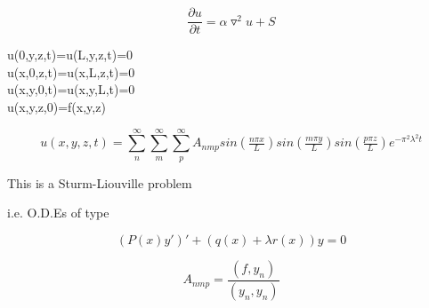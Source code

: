 \documentclass{beamer}
\begin{document}

\section{}

\begin{frame}{}

\begin{equation}
\dfrac{\partial u}{\partial t} = \alpha \triangledown^2 u + S
\end{equation}

u(0,y,z,t)=u(L,y,z,t)=0 \\
u(x,0,z,t)=u(x,L,z,t)=0 \\
u(x,y,0,t)=u(x,y,L,t)=0 \\

u(x,y,z,0)=f(x,y,z)


\begin{equation}
u(x,y,z,t) = \sum_{n}^{\infty}\sum_{m}^{\infty}\sum_{p}^{\infty} A_{nmp}sin(\tfrac{n\pi x}{L})sin(\tfrac{m\pi y}{L})sin(\tfrac{p\pi z}{L})e^{-\pi^2 \lambda^2 t}
\end{equation}

This is a Sturm-Liouville problem

i.e. O.D.Es of type

\begin{equation}
(P(x)y')'+(q(x)+\lambda r(x))y = 0
\end{equation}

\begin{equation}
A_{nmp}=\dfrac{(f,y_n)}{(y_n,y_n)}
\end{equation}

\vskip 1cm

\end{frame}
\end{document}
